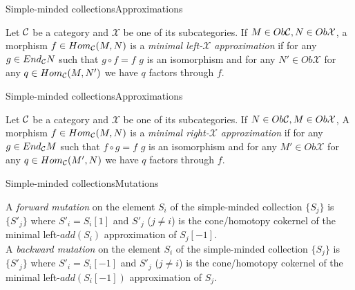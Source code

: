 \documentclass{beamer}
\begin{document}
\begin{frame}[fragile]{Simple-minded collections}{Approximations}
\begin{definition}
Let $\mathcal{C}$ be a category and $\mathcal{X}$ be one of its subcategories. If $M\in Ob\mathcal{C}, N\in Ob\mathcal{X}$, a morphism $f\in Hom_{\mathcal{C}}(M,N)$ is a \textit{minimal left-$\mathcal{X}$ approximation} if for any $g\in End_{\mathcal{C}} N$ such that $g\circ f = f$ $g$ is an isomorphism and for any $N'\in Ob\mathcal{X}$ for any $q\in Hom_{\mathcal{C}}(M,N')$ we have $q$ factors through $f$.\\\pause
\end{definition}
\end{frame}

\begin{frame}[fragile]{Simple-minded collections}{Approximations}
\begin{definition}
Let $\mathcal{C}$ be a category and $\mathcal{X}$ be one of its subcategories. If $N\in Ob\mathcal{C}, M\in Ob\mathcal{X}$, A morphism $f\in Hom_{\mathcal{C}}(M,N)$ is a \textit{minimal right-$\mathcal{X}$ approximation} if for any $g\in End_{\mathcal{C}} M$ such that $f\circ g = f$ $g$ is an isomorphism and for any $M'\in Ob\mathcal{X}$ for any $q\in Hom_{\mathcal{C}}(M',N)$ we have $q$ factors through $f$.\\\pause
\end{definition}
\end{frame}

\begin{frame}{Simple-minded collections}{Mutations}
\begin{definition}
A \textit{forward mutation} on the element $S_i$ of the simple-minded collection $\{S_j\}$ is $\{S'_j\}$ where $S'_i = S_i[1]$ and $S'_j$ ($j\neq i$) is the cone/homotopy cokernel of the minimal left-$add(S_i)$ approximation of $S_j[-1]$.\\\pause
A \textit{backward mutation} on the element $S_i$ of the simple-minded collection $\{S_j\}$ is $\{S'_j\}$ where $S'_i = S_i[-1]$ and $S'_j$ ($j\neq i$) is the cone/homotopy cokernel of the minimal left-$add(S_i[-1])$ approximation of $S_j$.\\\pause
\end{definition}
\end{frame}
\end{document}
